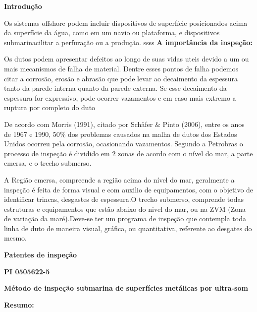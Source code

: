 \documentclass[a4paper,12pt]{article}
\begin{document}
	 
	
\hspace{-0,75cm}
\textbf{Introdução}
\vspace{1,0cm}


Os sistemas offshore podem incluir dispositivos de superfície
posicionados acima da superfície da água, como em um navio ou plataforma, e
dispositivos submarinacilitar a perfuração ou a produção.
ssss
\vspace{1,0cm}
\hspace{-0,75cm}
\textbf{A importância da inspeção:}
\vspace{1,0cm}

Os dutos podem apresentar defeitos ao longo de suas vidas uteis devido a um ou mais
mecanismos de falha de material. Dentre esses pontos de falha podemos citar a corrosão, erosão e
abrasão que pode levar ao decaimento da espessura tanto da parede interna quanto da parede externa.
Se esse decaimento da espessura for expressivo, pode ocorrer vazamentos e em caso mais extremo a
ruptura por completo do duto

De acordo com Morris (1991), citado por Schäfer \& Pinto (2006), entre os anos de 1967 e 1990,
50\% dos problemas causados na malha de dutos dos Estados Unidos ocorreu pela corrosão, ocasionando
vazamentos.
Segundo a Petrobras o processo de inspeção é dividido em 2 zonas de acordo com o nível do mar, a parte emersa, e o trecho submerso.

A Região emersa, compreende a região acima do nível do mar, geralmente a inspeção é feita de forma visual e com auxilio de equipamentos, com o objetivo de identificar trincas, desgastes de espessura.O trecho submerso, comprende todas estruturas e equipamentos que estão abaixo do nivel do mar, ou na ZVM (Zona de variação da maré).Deve-se ter um programa de inspeção que contempla toda linha de duto de maneira visual, gráfica, ou quantitativa, referente ao desgates do mesmo.

\vspace{1,0cm}
\hspace{-0,75cm}
 \textbf{Patentes de inspeção}
 
 \vspace{1,0cm}
 \begin{center}
  \textbf{PI 0505622-5} 
 
 \textbf{Método de inspeção submarina de superfícies metálicas por ultra-som}
 \end{center}
 
 \textbf{Resumo:}
 
\end{document}
